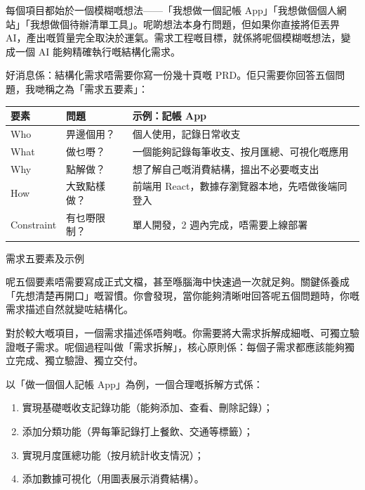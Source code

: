 


每個項目都始於一個模糊嘅想法——「我想做一個記帳 App」「我想做個個人網站」「我想做個待辦清單工具」。呢啲想法本身冇問題，但如果你直接將佢丟畀 AI，產出嘅質量完全取決於運氣。需求工程嘅目標，就係將呢個模糊嘅想法，變成一個 AI 能夠精確執行嘅結構化需求。

好消息係：結構化需求唔需要你寫一份幾十頁嘅 PRD。佢只需要你回答五個問題，我哋稱之為「需求五要素」：

\begin{center}
\begin{tabularx}{\linewidth}{|X|X|X|}
\hline
\textbf{要素} & \textbf{問題} & \textbf{示例：記帳 App} \tabularnewline
\hline
Who & 畀邊個用？ & 個人使用，記錄日常收支 \tabularnewline
What & 做乜嘢？ & 一個能夠記錄每筆收支、按月匯總、可視化嘅應用 \tabularnewline
Why & 點解做？ & 想了解自己嘅消費結構，搵出不必要嘅支出 \tabularnewline
How & 大致點樣做？ & 前端用 React，數據存瀏覽器本地，先唔做後端同登入 \tabularnewline
Constraint & 有乜嘢限制？ & 單人開發，2 週內完成，唔需要上線部署 \tabularnewline
\hline
\end{tabularx}
\end{center}

\begin{center}\small\color{gray}需求五要素及示例\end{center}

呢五個要素唔需要寫成正式文檔，甚至喺腦海中快速過一次就足夠。關鍵係養成「先想清楚再開口」嘅習慣。你會發現，當你能夠清晰咁回答呢五個問題時，你嘅需求描述自然就變咗結構化。


對於較大嘅項目，一個需求描述係唔夠嘅。你需要將大需求拆解成細嘅、可獨立驗證嘅子需求。呢個過程叫做「需求拆解」，核心原則係：每個子需求都應該能夠獨立完成、獨立驗證、獨立交付。

以「做一個個人記帳 App」為例，一個合理嘅拆解方式係：

\begin{enumerate}
  \item 實現基礎嘅收支記錄功能（能夠添加、查看、刪除記錄）；
  \item 添加分類功能（畀每筆記錄打上餐飲、交通等標籤）；
  \item 實現月度匯總功能（按月統計收支情況）；
  \item 添加數據可視化（用圖表展示消費結構）。
\end{enumerate}

